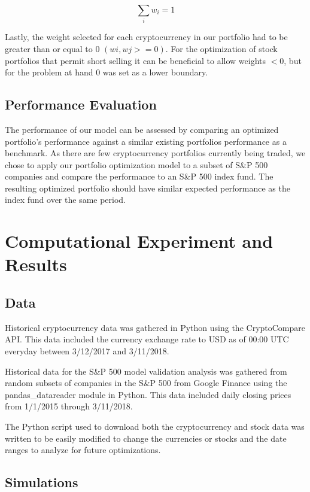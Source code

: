 \documentclass[12pt]{article} %
\begin{document}
\begin{equation} 
\sum_i w_i = 1
\end{equation}
 
Lastly, the weight selected for each cryptocurrency in our portfolio had to be greater than or equal to 0 $(wi , wj >= 0)$.  For the optimization of stock portfolios that permit short selling it can be beneficial to allow weights $<0$, but for the problem at hand 0 was set as a lower boundary. 

\subsection{Performance Evaluation}

The performance of our model can be assessed by comparing an optimized portfolio’s performance against a similar existing portfolios performance as a benchmark. As there are few cryptocurrency portfolios currently being traded, we chose to apply our portfolio optimization model to a subset of S\&P 500 companies and compare the performance to an S\&P 500 index fund. The resulting optimized portfolio should have similar expected performance as the index fund over the same period.  

\section{Computational Experiment and Results}

\subsection{Data}

Historical cryptocurrency data was gathered in Python using the CryptoCompare API. This data included the currency exchange rate to USD as of 00:00 UTC everyday between 3/12/2017 and 3/11/2018. 

Historical data for the S\&P 500 model validation analysis was gathered from random subsets of companies in the S\&P 500 from Google Finance using the pandas\_datareader module in Python. This data included daily closing prices from 1/1/2015 through 3/11/2018.

The Python script used to download both the cryptocurrency and stock data was written to be easily modified to change the currencies or stocks and the date ranges to analyze for future optimizations.

\subsection{Simulations}
\end{document}
